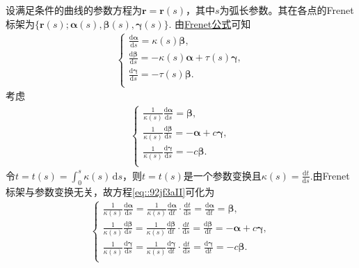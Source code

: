 \documentclass[../../main.tex]{subfiles}%
\begin{document}
\begin{solution}
设满足条件的曲线的参数方程为$\bm{r}=\bm{r}(s)$，其中$s$为弧长参数。其在各点的Frenet标架为$\{\bm{r}(s);\bm{\alpha}(s),\bm{\beta}(s),\bm{\gamma}(s)\}$.
由\hyperref[theorem:微分几何-Frenet公式]{Frenet公式}可知
\begin{align}\label{eq::Frenet1}
\begin{cases}
\frac{\mathrm{d}\boldsymbol{\alpha }}{\mathrm{d}s}=\kappa (s)\boldsymbol{\beta },\\
\frac{\mathrm{d}\boldsymbol{\beta }}{\mathrm{d}s}=-\kappa (s)\boldsymbol{\alpha }+\tau (s)\boldsymbol{\gamma },\\
\frac{\mathrm{d}\boldsymbol{\gamma }}{\mathrm{d}s}=-\tau (s)\boldsymbol{\beta }.\\
\end{cases}
\end{align}
考虑
\begin{align}\label{eq::92jf3aII}
\begin{cases}
\frac{1}{\kappa (s)}\frac{\mathrm{d}\boldsymbol{\alpha }}{\mathrm{d}s}=\boldsymbol{\beta },\\
\frac{1}{\kappa (s)}\frac{\mathrm{d}\boldsymbol{\beta }}{\mathrm{d}s}=-\boldsymbol{\alpha }+c\boldsymbol{\gamma },\\
\frac{1}{\kappa (s)}\frac{\mathrm{d}\boldsymbol{\gamma }}{\mathrm{d}s}=-c\boldsymbol{\beta }.\\
\end{cases}
\end{align}
令$t=t(s)=\int_0^s{\kappa (s)\,\mathrm{d}s}$，则$t=t(s)$是一个参数变换且$\kappa(s)=\frac{\mathrm{d}t}{\mathrm{d}s}$.由Frenet标架与参数变换无关，故方程\eqref{eq::92jf3aII}可化为
\begin{align}\label{eq::Frenet121234231}
\begin{cases}
\frac{1}{\kappa \left( s \right)}\frac{\mathrm{d}\boldsymbol{\alpha }}{\mathrm{d}s}=\frac{1}{\kappa \left( s \right)}\frac{\mathrm{d}\boldsymbol{\alpha }}{\mathrm{d}t}\cdot \frac{\mathrm{d}t}{\mathrm{d}s}=\frac{\mathrm{d}\boldsymbol{\alpha }}{\mathrm{d}t}=\boldsymbol{\beta },\\
\frac{1}{\kappa \left( s \right)}\frac{\mathrm{d}\boldsymbol{\beta }}{\mathrm{d}s}=\frac{1}{\kappa \left( s \right)}\frac{\mathrm{d}\boldsymbol{\beta }}{\mathrm{d}t}\cdot \frac{\mathrm{d}t}{\mathrm{d}s}=\frac{\mathrm{d}\boldsymbol{\beta }}{\mathrm{d}t}=-\boldsymbol{\alpha }+c\boldsymbol{\gamma },\\
\frac{1}{\kappa \left( s \right)}\frac{\mathrm{d}\boldsymbol{\gamma }}{\mathrm{d}s}=\frac{1}{\kappa \left( s \right)}\frac{\mathrm{d}\boldsymbol{\gamma }}{\mathrm{d}t}\cdot \frac{\mathrm{d}t}{\mathrm{d}s}=\frac{\mathrm{d}\boldsymbol{\gamma }}{\mathrm{d}t}=-c\boldsymbol{\beta }.\\

\end{cases}
\end{align}
\end{solution}
\end{document}
